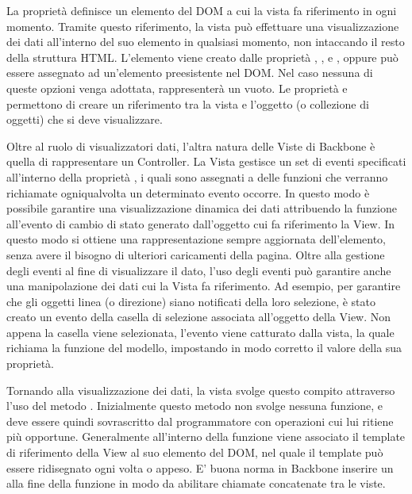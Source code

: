 La proprietà  definisce un elemento del DOM a cui la vista fa riferimento in ogni momento. Tramite questo riferimento, la vista può effettuare una visualizzazione dei dati all'interno del suo elemento  in qualsiasi momento, non intaccando il resto della struttura HTML. L'elemento  viene creato dalle proprietà , ,  e , oppure può essere assegnato ad un'elemento preesistente nel DOM. Nel caso nessuna di queste opzioni venga adottata,  rappresenterà un  vuoto.
Le proprietà  e  permettono di creare un riferimento tra la vista e l'oggetto (o collezione di oggetti) che si deve visualizzare.

Oltre al ruolo di visualizzatori dati, l'altra natura delle Viste di Backbone è quella di rappresentare un Controller. La Vista gestisce un set di eventi specificati all'interno della proprietà , i quali sono assegnati a delle funzioni che verranno richiamate ogniqualvolta un determinato evento occorre.
In questo modo è possibile garantire una visualizzazione dinamica dei dati attribuendo la funzione  all'evento di cambio di stato generato dall'oggetto cui fa riferimento la View. In questo modo si ottiene una rappresentazione sempre aggiornata dell'elemento, senza avere il bisogno di ulteriori caricamenti della pagina.
Oltre alla gestione degli eventi al fine di visualizzare il dato, l'uso degli eventi può garantire anche una manipolazione dei dati cui la Vista fa riferimento.
Ad esempio, per garantire che gli oggetti linea (o direzione) siano notificati della loro selezione, è stato creato un evento  della casella di selezione associata all'oggetto della View. Non appena la casella viene selezionata, l'evento viene catturato dalla vista, la quale richiama la funzione  del modello, impostando in modo corretto il valore della sua proprietà.

Tornando alla visualizzazione dei dati, la vista svolge questo compito attraverso l'uso del metodo . Inizialmente questo metodo non svolge nessuna funzione, e deve essere quindi sovrascritto dal programmatore con operazioni cui lui ritiene più opportune.
Generalmente all'interno della funzione  viene associato il template di riferimento della View al suo elemento del DOM, nel quale il template può essere ridisegnato ogni volta o appeso. E' buona norma in Backbone inserire un  alla fine della funzione  in modo da abilitare chiamate concatenate tra le viste.

